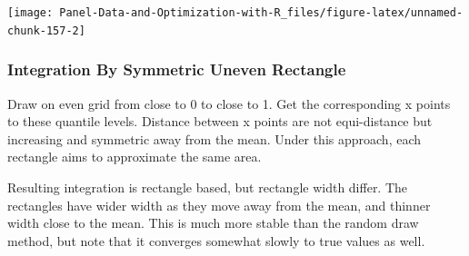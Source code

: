 \documentclass[
]{book}
\begin{document}
\begin{center}\texttt{[image: Panel-Data-and-Optimization-with-R\_files/figure-latex/unnamed-chunk-157-2]} \end{center}

\hypertarget{integration-by-symmetric-uneven-rectangle}{%
\subsubsection{Integration By Symmetric Uneven Rectangle}\label{integration-by-symmetric-uneven-rectangle}}

Draw on even grid from close to 0 to close to 1. Get the corresponding x points to these quantile levels. Distance between x points are not equi-distance but increasing and symmetric away from the mean. Under this approach, each rectangle aims to approximate the same area.

Resulting integration is rectangle based, but rectangle width differ. The rectangles have wider width as they move away from the mean, and thinner width close to the mean. This is much more stable than the random draw method, but note that it converges somewhat slowly to true values as well.
\end{document}
